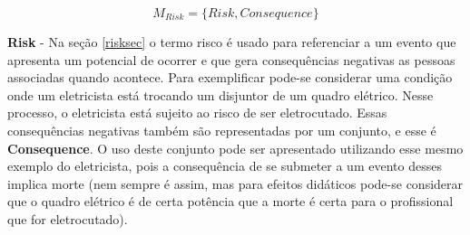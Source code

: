 \begin{equation}
    M_{Risk} = \{ Risk, Consequence \}
\end{equation}

\textbf{Risk} - Na seção \ref{risksec} o termo risco é usado para referenciar a um evento que apresenta um potencial de ocorrer e que 
gera consequências negativas as pessoas associadas quando acontece. Para exemplificar pode-se considerar uma condição onde um eletricista 
está trocando um disjuntor de um quadro elétrico. Nesse processo, o eletricista está sujeito ao risco de ser eletrocutado. Essas 
consequências negativas também são representadas por um conjunto, e esse é \textbf{Consequence}. O uso deste conjunto pode ser 
apresentado utilizando esse mesmo exemplo do eletricista, pois a consequência de se submeter a um evento desses implica morte (nem sempre é assim, mas para efeitos didáticos pode-se considerar que o quadro elétrico é de certa potência que a morte é certa para o profissional
que for eletrocutado).